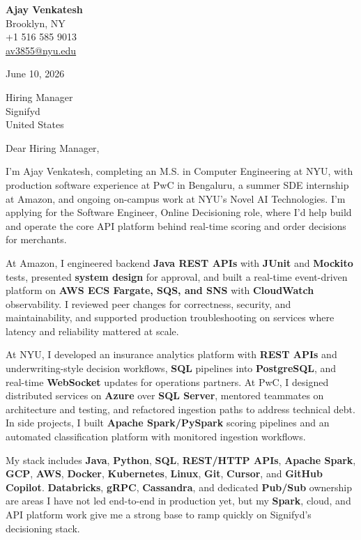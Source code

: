 \documentclass[letterpaper,11pt]{article}
\begin{document}
\begin{flushleft}
\textbf{\large Ajay Venkatesh} \\
Brooklyn, NY \\
+1 516 585 9013 \\
\href{mailto:av3855@nyu.edu}{av3855@nyu.edu}
\end{flushleft}
\vspace{10pt}
June 10, 2026
\vspace{6pt}

Hiring Manager \\
Signifyd \\
United States

\vspace{10pt}

Dear Hiring Manager,

I'm Ajay Venkatesh, completing an M.S. in Computer Engineering at NYU, with production software experience at PwC in Bengaluru, a summer SDE internship at Amazon, and ongoing on-campus work at NYU's Novel AI Technologies. I'm applying for the Software Engineer, Online Decisioning role, where I'd help build and operate the core API platform behind real-time scoring and order decisions for merchants.

At Amazon, I engineered backend \textbf{Java REST APIs} with \textbf{JUnit} and \textbf{Mockito} tests, presented \textbf{system design} for approval, and built a real-time event-driven platform on \textbf{AWS ECS Fargate, SQS, and SNS} with \textbf{CloudWatch} observability. I reviewed peer changes for correctness, security, and maintainability, and supported production troubleshooting on services where latency and reliability mattered at scale.

At NYU, I developed an insurance analytics platform with \textbf{REST APIs} and underwriting-style decision workflows, \textbf{SQL} pipelines into \textbf{PostgreSQL}, and real-time \textbf{WebSocket} updates for operations partners. At PwC, I designed distributed services on \textbf{Azure} over \textbf{SQL Server}, mentored teammates on architecture and testing, and refactored ingestion paths to address technical debt. In side projects, I built \textbf{Apache Spark/PySpark} scoring pipelines and an automated classification platform with monitored ingestion workflows.

My stack includes \textbf{Java}, \textbf{Python}, \textbf{SQL}, \textbf{REST/HTTP APIs}, \textbf{Apache Spark}, \textbf{GCP}, \textbf{AWS}, \textbf{Docker}, \textbf{Kubernetes}, \textbf{Linux}, \textbf{Git}, \textbf{Cursor}, and \textbf{GitHub Copilot}. \textbf{Databricks}, \textbf{gRPC}, \textbf{Cassandra}, and dedicated \textbf{Pub/Sub} ownership are areas I have not led end-to-end in production yet, but my \textbf{Spark}, cloud, and API platform work give me a strong base to ramp quickly on Signifyd's decisioning stack.
\end{document}
